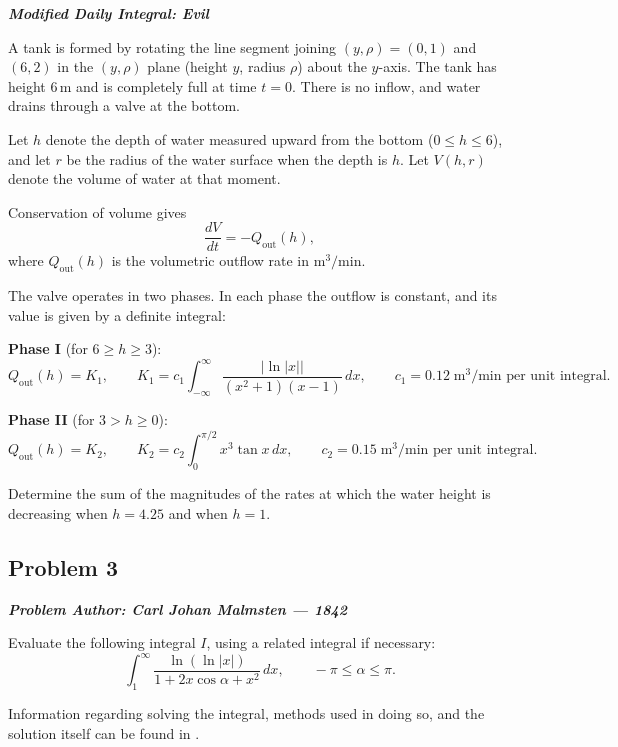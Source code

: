 \documentclass[openany,oneside,12pt,hidelinks]{book}
\newcommand{\problemmeta}[1]{%
  \begin{cataloguebox}\textbf{\emph{#1}}\end{cataloguebox}%
}
\begin{document}
\problemmeta{Modified Daily Integral: Evil}

A tank is formed by rotating the line segment joining
\((y,\rho)=(0,1)\) and \((6,2)\) in the \((y,\rho)\) plane (height \(y\), radius
\(\rho\)) about the \(y\)-axis. The tank has height \(6\,\mathrm{m}\) and is
completely full at time \(t=0\). There is no inflow, and water drains through a
valve at the bottom.

Let \(h\) denote the depth of water measured upward from the bottom
(\(0 \le h \le 6\)), and let \(r\) be the radius of the water surface when the
depth is \(h\). Let \(V(h,r)\) denote the volume of water at that moment.

Conservation of volume gives
\[
  \frac{dV}{dt} = -Q_{\mathrm{out}}(h),
\]
where \(Q_{\mathrm{out}}(h)\) is the volumetric outflow rate in
\(\mathrm{m}^3/\mathrm{min}\).

The valve operates in two phases. In each phase the outflow is constant, and
its value is given by a definite integral:

\medskip

\textbf{Phase I} (for \(6 \ge h \ge 3\)):
\[
  Q_{\mathrm{out}}(h) = K_{1},
  \qquad
  K_{1} = c_{1}\int_{-\infty}^{\infty}
  \frac{|\ln|x||}{(x^{2}+1)(x-1)}\,dx,
  \qquad
  c_{1} = 0.12\;\text{m}^3/\text{min per unit integral}.
\]

\medskip

\textbf{Phase II} (for \(3 > h \ge 0\)):
\[
  Q_{\mathrm{out}}(h) = K_{2},
  \qquad
  K_{2} = c_{2}\int_{0}^{\pi/2} x^{3}\tan x\,dx,
  \qquad
  c_{2} = 0.15\;\text{m}^3/\text{min per unit integral}.
\]

\medskip

Determine the sum of the magnitudes of the rates at which the water height is
decreasing when \(h=4.25\) and when \(h=1\).


\subsection{Problem 3}

\problemmeta{Problem Author: Carl Johan Malmsten --- 1842}

Evaluate the following integral \(I\), using a related integral if necessary:
\[
  \int_{1}^{\infty}
  \frac{\ln(\ln|x|)}{1+2x\cos\alpha+x^{2}}\,dx,
  \qquad
  -\pi \le \alpha \le \pi.
\]

Information regarding solving the integral, methods used in doing so, and the
solution itself can be found in \cite{abdulsalam2022new}.
\end{document}
